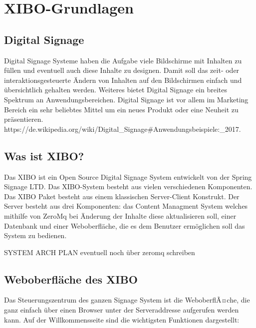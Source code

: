 \chapter{XIBO-Grundlagen}
\section{Digital Signage}\label{sec:digitalsignage}
Digital Signage Systeme haben die Aufgabe viele Bildschirme mit Inhalten zu füllen und eventuell auch diese Inhalte zu designen. Damit soll das zeit- oder interaktionsgesteuerte Ändern von Inhalten auf den Bildschirmen einfach und übersichtlich gehalten werden. Weiteres bietet Digital Signage ein breites Spektrum an Anwendungsbereichen.   
Digital Signage ist vor allem im Marketing Bereich ein sehr beliebtes Mittel um ein neues Produkt oder eine Neuheit zu präsentieren. https://de.wikipedia.org/wiki/Digital_Signage#Anwendungsbeispiele:_2017.

\section{Was ist XIBO?}\label{sec:xibo}
Das XIBO ist ein Open Source Digital Signage System entwickelt von der Spring Signage LTD. Das XIBO-System besteht aus vielen verschiedenen Komponenten. Das XIBO Paket besteht aus einem klassischen Server-Client Konstrukt. Der Server besteht aus drei Komponenten: das Content Managment System welches mithilfe von ZeroMq bei Änderung der Inhalte diese aktualisieren soll, einer Datenbank und einer Weboberfläche, die es dem Benutzer ermöglichen soll das System zu bedienen.

SYSTEM ARCH PLAN eventuell noch über zeromq schreiben

\section{Weboberfläche des XIBO}\label{sec:webpagexibo}
Das Steuerungszentrum des ganzen Signage System ist die WeboberflÃ¤che, die ganz einfach über einen Browser unter der Serveraddresse aufgerufen werden kann. Auf der Willkommensseite sind die wichtigsten Funktionen dargestellt:

